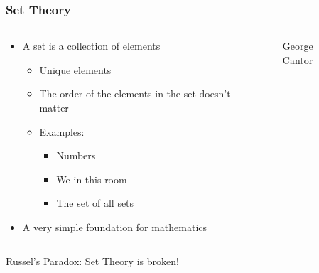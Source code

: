 \documentclass[aspectratio=169,10pt]{beamer}
\begin{document}
\begin{frame}
  \frametitle{Set Theory}
  \begin{columns}
    \begin{column}{0.75\textwidth}
      \begin{itemize}
        \item A set is a collection of elements
              \begin{itemize}
                \item Unique elements
                \item The order of the elements in the set doesn't matter
                \item Examples:
                      \begin{itemize}
                        \item Numbers
                        \item We in this room
                        \item The set of all sets
                      \end{itemize}
              \end{itemize}
              \pause
        \item A very simple foundation for mathematics
      \end{itemize}
    \end{column}
    \begin{column}{0.2\textwidth}
      \begin{figure}
        \caption{George Cantor}
      \end{figure}
    \end{column}
  \pause
  \end{columns}
  \begin{block}{Russel's Paradox: Set Theory is broken!}
    \begin{columns}

\end{columns}
\end{block}
\end{frame}
\end{document}
